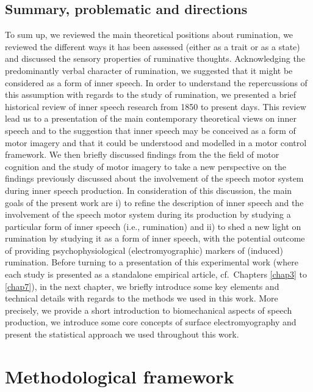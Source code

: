 \documentclass[a4paper,12pt,twoside,openright,oldfontcommands,final]{memoir}
\begin{document}
\hypertarget{summary-problematic-and-directions}{%
\section{Summary, problematic and directions}\label{summary-problematic-and-directions}}

To sum up, we reviewed the main theoretical positions about rumination, we reviewed the different ways it has been assessed (either as a trait or as a state) and discussed the sensory properties of ruminative thoughts. Acknowledging the predominantly verbal character of rumination, we suggested that it might be considered as a form of inner speech. In order to understand the repercussions of this assumption with regards to the study of rumination, we presented a brief historical review of inner speech research from 1850 to present days. This review lead us to a presentation of the main contemporary theoretical views on inner speech and to the suggestion that inner speech may be conceived as a form of motor imagery and that it could be understood and modelled in a motor control framework. We then briefly discussed findings from the the field of motor cognition and the study of motor imagery to take a new perspective on the findings previously discussed about the involvement of the speech motor system during inner speech production. In consideration of this discussion, the main goals of the present work are i) to refine the description of inner speech and the involvement of the speech motor system during its production by studying a particular form of inner speech (i.e., rumination) and ii) to shed a new light on rumination by studying it as a form of inner speech, with the potential outcome of providing psychophysiological (electromyographic) markers of (induced) rumination. Before turning to a presentation of this experimental work (where each study is presented as a standalone empirical article, cf.~Chapters \ref{chap3} to \ref{chap7}), in the next chapter, we briefly introduce some key elements and technical details with regards to the methods we used in this work. More precisely, we provide a short introduction to biomechanical aspects of speech production, we introduce some core concepts of surface electromyography and present the statistical approach we used throughout this work.

\hypertarget{chap2}{%
\chapter{Methodological framework}\label{chap2}}
\end{document}
